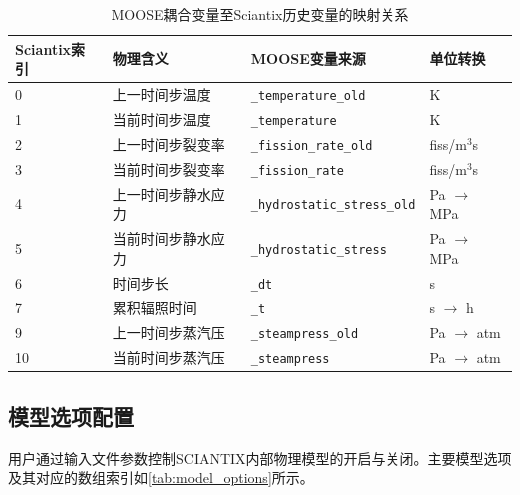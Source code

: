 \begin{table}[htbp]
	\centering
	\caption{MOOSE耦合变量至Sciantix历史变量的映射关系}
	\label{tab:history_map}
	\begin{tabularx}{\textwidth}{lllX}
		\toprule
		Sciantix索引 & 物理含义 & MOOSE变量来源 & 单位转换 \\
		\midrule
		0 & 上一时间步温度 & \texttt{\_temperature\_old} & K \\
		1 & 当前时间步温度 & \texttt{\_temperature} & K \\
		2 & 上一时间步裂变率 & \texttt{\_fission\_rate\_old} & fiss/m$^3$s \\
		3 & 当前时间步裂变率 & \texttt{\_fission\_rate} & fiss/m$^3$s \\
		4 & 上一时间步静水应力 & \texttt{\_hydrostatic\_stress\_old} & Pa $\to$ MPa \\
		5 & 当前时间步静水应力 & \texttt{\_hydrostatic\_stress} & Pa $\to$ MPa \\
		6 & 时间步长 & \texttt{\_dt} & s \\
		7 & 累积辐照时间 & \texttt{\_t} & s $\to$ h \\
		9 & 上一时间步蒸汽压 & \texttt{\_steampress\_old} & Pa $\to$ atm \\
		10 & 当前时间步蒸汽压 & \texttt{\_steampress} & Pa $\to$ atm \\
		\bottomrule
	\end{tabularx}
\end{table}

\subsection{模型选项配置}
用户通过输入文件参数控制SCIANTIX内部物理模型的开启与关闭。主要模型选项及其对应的数组索引如\tablename\ref{tab:model_options}所示。


